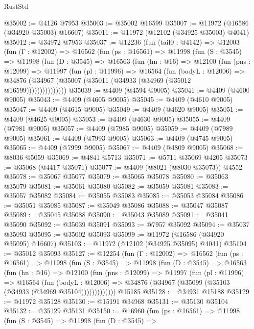 \begin{lexlean}{RustStd}
\begin{coremodule}
@35002 := @4126 @7953
@35003 := @35002 @16599
@35007 := @11972 (@16586 (@34920 @35003) @16607)
@35011 := @11972 (@12102 (@34925 @35003) @4041)
@35012 := @34972 @7953
@35037 := @12236
    (fun (tail0 : @4142) =>
    @12003
      (fun (Γ : @12002) =>
      @16562
        (fun (ps : @16561) =>
        @11998
          (fun (S : @3545) =>
          @11998
            (fun (D : @3545) =>
            @16563
              (fun (hn : @16) =>
              @12100
                (fun (pns : @12099) =>
                @11997
                  (fun (pl : @11996) =>
                  @16564
                    (fun (bodyL : @12006) =>
                    @34876 (@34967 (@35007 (@35011 (@34933 (@34969 (@35012 @16599)))))))))))))))
@35039 := @4409 (@4594 @9005)
@35041 := @4409 (@4600 @9005)
@35043 := @4409 (@4605 @9005)
@35045 := @4409 (@4610 @9005)
@35047 := @4409 (@4615 @9005)
@35049 := @4409 (@4620 @9005)
@35051 := @4409 (@4625 @9005)
@35053 := @4409 (@4630 @9005)
@35055 := @4409 (@7981 @9005)
@35057 := @4409 (@7985 @9005)
@35059 := @4409 (@7989 @9005)
@35061 := @4409 (@7993 @9005)
@35063 := @4409 (@4745 @9005)
@35065 := @4409 (@7999 @9005)
@35067 := @4409 (@4809 @9005)
@35068 := @8036 @5059
@35069 := @4841 @5713
@35071 := @5711 @35069 @4205
@35073 := @35068 (@4417 @35071)
@35077 := @4409 (@8021 (@8030 @35073)) @4552
@35078 := @35067 @35077
@35079 := @35065 @35078
@35080 := @35063 @35079
@35081 := @35061 @35080
@35082 := @35059 @35081
@35083 := @35057 @35082
@35084 := @35055 @35083
@35085 := @35053 @35084
@35086 := @35051 @35085
@35087 := @35049 @35086
@35088 := @35047 @35087
@35089 := @35045 @35088
@35090 := @35043 @35089
@35091 := @35041 @35090
@35092 := @35039 @35091
@35093 := @7957 @35092
@35094 := @35037 @35093
@35095 := @35002 @35093
@35099 := @11972 (@16586 (@34920 @35095) @16607)
@35103 := @11972 (@12102 (@34925 @35095) @4041)
@35104 := @35012 @35093
@35127 := @12254
    (fun (Γ : @12002) =>
    @16562
      (fun (ps : @16561) =>
      @11998
        (fun (S : @3545) =>
        @11998
          (fun (D : @3545) =>
          @16563
            (fun (hn : @16) =>
            @12100
              (fun (pns : @12099) =>
              @11997
                (fun (pl : @11996) =>
                @16564
                  (fun (bodyL : @12006) =>
                  @34876 (@34967 (@35099 (@35103 (@34933 (@34969 @35104)))))))))))))
    @15185
@35128 := @34931 @15188
@35129 := @11972 @35128
@35130 := @15191 @34968
@35131 := @35130 @35104
@35132 := @35129 @35131
@35150 := @16960
    (fun (ps : @16561) =>
    @11998
      (fun (S : @3545) =>
      @11998
        (fun (D : @3545) =>

\end{coremodule}
\end{lexlean}

